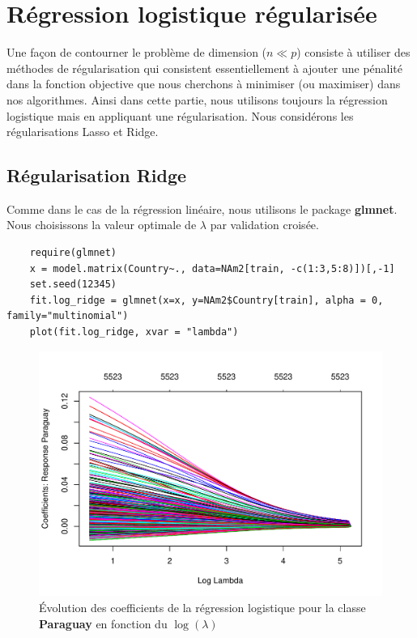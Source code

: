 \documentclass[12pt,a4paper]{article}
\begin{document}
\section{Régression logistique régularisée}
Une façon de contourner le problème de dimension ($n\ll p$) consiste à utiliser
des méthodes de régularisation qui consistent essentiellement à ajouter une
pénalité dans la fonction objective que nous cherchons à minimiser (ou
maximiser) dans nos algorithmes. Ainsi dans cette partie, nous utilisons
toujours la régression logistique mais en appliquant une régularisation. Nous
considérons les régularisations Lasso et Ridge.

\subsection{Régularisation Ridge}
Comme dans le cas de la régression linéaire, nous utilisons le package \textbf{glmnet}. Nous choisissons la valeur optimale de $\lambda$ par validation croisée.
\begin{lstlisting}
	require(glmnet)
	x = model.matrix(Country~., data=NAm2[train, -c(1:3,5:8)])[,-1]
	set.seed(12345)
	fit.log_ridge = glmnet(x=x, y=NAm2$Country[train], alpha = 0, family="multinomial")
	plot(fit.log_ridge, xvar = "lambda")
\end{lstlisting}
\begin{figure}[h!]
	\begin{center}
		\includegraphics[scale=0.5]{figures/coef_ridge.pdf}
		\caption{Évolution des coefficients de la régression logistique pour la classe \textbf{Paraguay} en fonction du $\log(\lambda)$}
		\label{fig:r_lambda}
	\end{center}
\end{figure}
\end{document}
